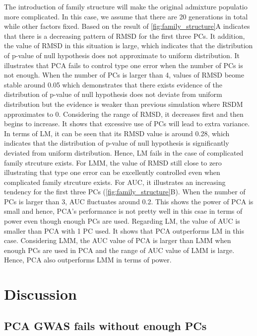 \documentclass[12pt]{article}
\begin{document}
The introduction of family structure will make the original admixture populatio more complicated.
In this case, we assume that there are 20 generations in total while other factors fixed.
Based on the result of \cref{fig:family_structure}A indicates that there is a decreasing pattern of RMSD for the first three PCs.
It addition, the value of RMSD in this situation is large, which indicates that the distribution of p-value of null hypothesis does not approximate to uniform distribution.
It illustrates that PCA fails to control type one error when the number of PCs is not enough.
When the number of PCs is larger than 4, values of RMSD beome stable around 0.05 which demonstrates that there exists evidence of the distribution of p-value of null hypothesis does not deviate from uniform distribution but the evidence is weaker than previous simulation where RSDM approximates to 0.
Considering the range of RMSD, it decreases first and then begins to increase.
It shows that excessive use of PCs will lead to extra variance.
In terms of LM, it can be seen that its RMSD value is around 0.28, which indicates that the distribution of p-value of null hypothesis is significantly deviated from uniform distribution. Hence, LM fails in the case of complicated family strcuture exists.  
For LMM, the value of RMSD still close to zero illustrating that type one error can be excellently controlled even when complicated family strcuture exists.
For AUC, it illustrates an increasing tendency for the first three PCs (\cref{fig:family_structure}B).
When the number of PCs is larger than 3, AUC fluctuates around 0.2.
This shows the power of PCA is small and hence, PCA's performance is not pretty well in this csae in terms of power even though enough PCs are used. 
Regarding LM, the value of AUC is smaller than PCA with 1 PC used. 
It shows that PCA outperforms LM in this case.
Considering LMM, the AUC value of PCA is larger than LMM when enough PCs are used in PCA and the range of AUC value of LMM is large.
Hence, PCA also outperforms LMM in terms of power.



\section{Discussion}

\subsection{PCA GWAS fails without enough PCs}
\end{document}
